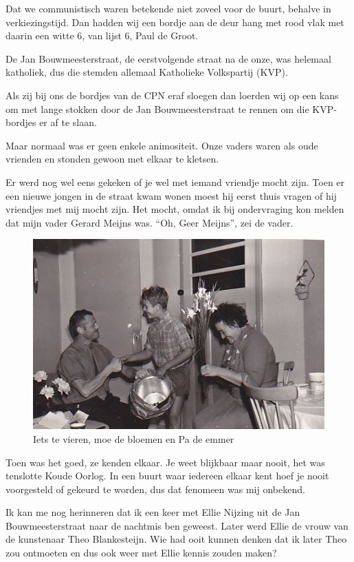 \documentclass[12pt,twoside, openright]{memoir}
\begin{document}
Dat we communistisch waren betekende niet zoveel voor de buurt, behalve in verkiezingstijd. Dan hadden wij een bordje aan de deur hang met rood vlak met daarin een witte 6, van lijst 6, Paul de Groot. 


De Jan Bouwmeesterstraat, de eerstvolgende straat na de onze, was helemaal katholiek, dus die stemden allemaal Katholieke Volkspartij (KVP). 

Als zij bij ons de bordjes van de CPN eraf sloegen dan loerden wij op een kans om met lange stokken door de Jan Bouwmeesterstraat te rennen om die KVP-bordjes er af te slaan.

Maar normaal was er geen enkele animositeit. Onze vaders waren als oude vrienden en stonden gewoon met elkaar te kletsen. 

Er werd nog wel eens gekeken of je wel met iemand vriendje mocht zijn. Toen er een nieuwe jongen in de straat kwam wonen moest hij eerst thuis vragen of hij vriendjes met mij mocht zijn. Het mocht, omdat ik bij ondervraging kon melden dat mijn vader Gerard Meijns was. ``Oh, Geer Meijns'', zei de vader. 

\begin{figure}
\centering
\includegraphics[width=\textwidth]{img/ch5/vanharte}
\caption*{\footnotesize Iets te vieren, moe de bloemen en Pa de emmer }
\end{figure} 

Toen was het goed, ze kenden elkaar. Je weet blijkbaar maar nooit, het was tenslotte Koude Oorlog. In een buurt waar iedereen elkaar kent hoef je nooit voorgesteld of gekeurd te worden, dus dat fenomeen was mij onbekend.

Ik kan me nog herinneren dat ik een keer met Ellie Nijzing uit de Jan Bouwmeesterstraat naar de nachtmis ben geweest. Later werd Ellie de vrouw van de kunstenaar Theo Blankesteijn. Wie had ooit kunnen denken dat ik later Theo zou ontmoeten en dus ook weer met Ellie kennis zouden maken?
\end{document}

